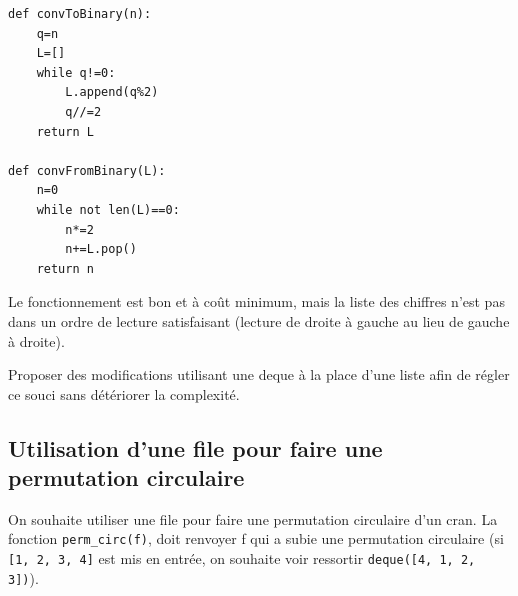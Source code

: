 \begin{lstlisting}
def convToBinary(n):
    q=n
    L=[]
    while q!=0:
        L.append(q%2)
        q//=2
    return L

def convFromBinary(L):
    n=0
    while not len(L)==0:
        n*=2
        n+=L.pop()
    return n
\end{lstlisting}


Le fonctionnement est bon et à coût minimum, mais la liste des chiffres n'est pas dans un ordre de lecture satisfaisant (lecture de droite à gauche au lieu de gauche à droite). 

Proposer des modifications utilisant une deque à la place d'une liste afin de régler ce souci sans détériorer la complexité.
   
\begin{python}
\end{python}

\subsection{Utilisation d'une file pour faire une permutation circulaire}

On souhaite utiliser une file pour faire une permutation circulaire d'un cran. La fonction \texttt{perm\_circ(f)}, doit renvoyer f qui a subie une permutation circulaire (si \texttt{[1, 2, 3, 4]} est mis en entrée, on souhaite voir ressortir \texttt{deque([4, 1, 2, 3])}).

